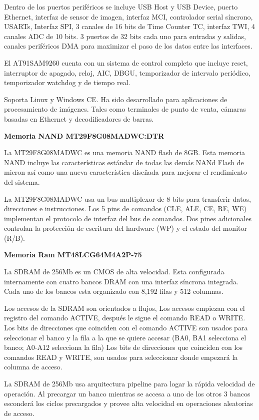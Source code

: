 Dentro de los puertos perif\'ericos se incluye USB Host y USB Device, puerto Ethernet, interfaz de sensor de imagen, interfaz MCI, controlador serial síncrono, USARTs, Interfaz SPI, 3 canales de 16 bits de Time Counter TC, interfaz TWI, 4 canales ADC de 10 bits. 3 puertos de 32 bits cada uno para entradas y salidas, canales perif\'ericos DMA para maximizar el paso de los datos entre las interfaces.\medskip

El AT91SAM9260 cuenta con un sistema de control completo que incluye reset, interruptor de apagado, reloj, AIC, DBGU, temporizador de intervalo periódico, temporizador watchdog y de tiempo real.\medskip
 
Soporta Linux y Windows CE. Ha sido desarrollado para aplicaciones de procesamiento de im\'agenes. Tales como terminales de punto de venta, c\'amaras basadas en Ethernet y decodificadores de barras.\medskip

\textbf{Memoria NAND MT29F8G08MADWC:DTR}\medskip

La MT29F8G08MADWC es una memoria NAND flash de 8GB. Esta memoria NAND incluye las caracter\'isticas est\'andar de todas las dem\'as NANd Flash de micron as\'i como una nueva caracter\'istica diseñada para mejorar el rendimiento del sistema.\medskip \cite{mt29}

La MT29F8G08MADWC usa un bus multiplexor de 8 bits para transferir datos, direcciones e instrucciones. Los 5 pins de comandos (CLE, ALE, CE, RE, WE) implementan el protocolo de interfaz del bus de comandos. Dos pines adicionales controlan la protecci\'on de escritura del hardware (WP) y el estado del monitor (R/B).\medskip

\textbf{Memoria Ram MT48LCG64M4A2P-75}\medskip

La SDRAM de 256Mb es un CMOS de alta velocidad. Esta configurada internamente con cuatro bancos DRAM con una interfaz s\'incrona integrada. Cada uno de los bancos esta organizado con 8,192 filas y 512 columnas.\medskip \cite{mt48}

Los accesos de la SDRAM son orientados a flujos, Los accesos empiezan con el registro del comando ACTIVE, despu\'es le sigue el comando READ o WRITE. Los bits de direcciones que coinciden con el comando ACTIVE son usados para seleccionar el banco y la fila a la que se quiere accesar (BA0, BA1 selecciona el banco; A0-A12 selecciona la fila) Los bits de direcciones que coinciden con los comandos READ y WRITE, son usados para seleccionar donde empezar\'a la columna de acceso.\medskip

La SDRAM de 256Mb usa arquitectura pipeline para logar la r\'apida velocidad de operaci\'on. Al precargar un banco mientras se accesa a uno de los otros 3 bancos esconder\'a los ciclos precargados y provee alta velocidad en operaciones aleatorias de acceso.\medskip

